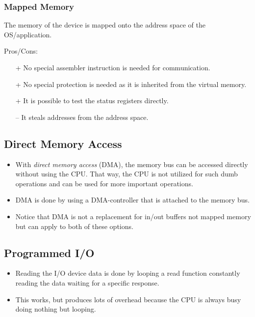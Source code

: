             \subsubsection{Mapped Memory}
	            The memory of the device is mapped onto the address space of the OS/application.
	            
	            Pros/Cons:
	            \begin{itemize}
	            	\item[+] No special assembler instruction is needed for communication.
	            	\item[+] No special protection is needed as it is inherited from the virtual memory.
	            	\item[+] It is possible to test the status registers directly.
	            	\item[--] It steals addresses from the address space.
	            \end{itemize}
            
            \subsection{Direct Memory Access}
	            \begin{itemize}
	            	\item With \textit{direct memory access} (DMA), the memory bus can be accessed directly without using the CPU. That way, the CPU is not utilized for such dumb operations and can be used for more important operations.
	            	\item DMA is done by using a DMA-controller that is attached to the memory bus.
	            	\item Notice that DMA is not a replacement for in/out buffers not mapped memory but can apply to both of these options.
	            \end{itemize}

        \subsection{Programmed I/O}
            \begin{itemize}
            	\item Reading the I/O device data is done by looping a read function constantly reading the data waiting for a specific response.
            	\item This works, but produces lots of overhead because the CPU is always busy doing nothing but looping.
            \end{itemize}

